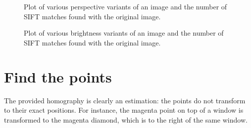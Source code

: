 \documentclass[a4paper,10pt,twoside,draft]{article}
\begin{document}
\begin{figure}
  \begin{center}
  \end{center}
  \caption{Plot of various perspective variants of an image and the number of SIFT matches found with the original image.}
  \label{fig:perspective}
\end{figure}

\begin{figure}
  \begin{center}
  \end{center}
  \caption{Plot of various brightness variants of an image and the number of SIFT matches found with the original image.}
  \label{fig:brightness}
\end{figure}

\section{Find the points}
The provided homography is clearly an estimation: the points do not transform to their exact positions.  For instance, the magenta point on top of a window is transformed to the magenta diamond, which is to the right of the same window.
\end{document}
